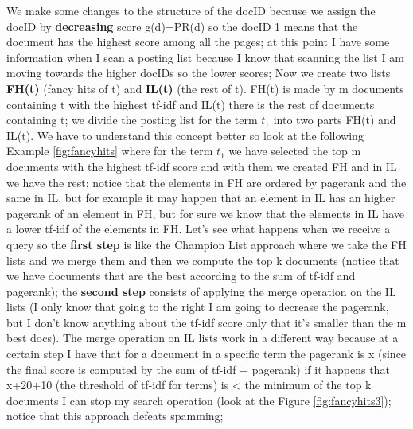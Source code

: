 \begin{itemize}
    We make some changes to the structure of the docID because we assign the docID by \textbf{decreasing} score g(d)=PR(d) so the docID 1 means that the document has the highest score among all the pages; at this point I have some information when I scan a posting list because I know that scanning the list I am moving towards the higher docIDs so the lower scores; Now we create two lists \textbf{FH(t)} (fancy hits of t) and \textbf{IL(t)} (the rest of t). FH(t) is made by m documents containing t with the highest tf-idf and IL(t) there is the rest of documents containing t; we divide the posting list for the term $t_1$ into two parts FH(t) and IL(t). We have to understand this concept better so look at the following Example \ref{fig:fancyhits} where for the term $t_1$ we have selected the top m documents with the highest tf-idf score and with them we created FH and in IL we have the rest; notice that the elements in FH are ordered by pagerank and the same in IL, but for example it may happen that an element in IL has an higher pagerank of an element in FH, but for sure we know that the elements in IL have a lower tf-idf of the elements in FH.\newline
    Let's see what happens when we receive a query so the \textbf{first step} is like the Champion List approach where we take the FH lists and we merge them and then we compute the top k documents (notice that we have documents that are the best according to the sum of tf-idf and pagerank); the \textbf{second step} consists of applying the merge operation on the IL lists (I only know that going to the right I am going to decrease the pagerank, but I don't know anything about the tf-idf score only that it's smaller than the m best docs). The merge operation on IL lists work in a different way because at a certain step I have that for a document in a specific term the pagerank is x (since the final score is computed by the sum of tf-idf + pagerank) if it happens that x+20+10 (the threshold of tf-idf for terms) is < the minimum of the top k documents I can stop my search operation (look at the Figure \ref{fig:fancyhits3}); notice that this approach defeats spamming;

\end{itemize}
